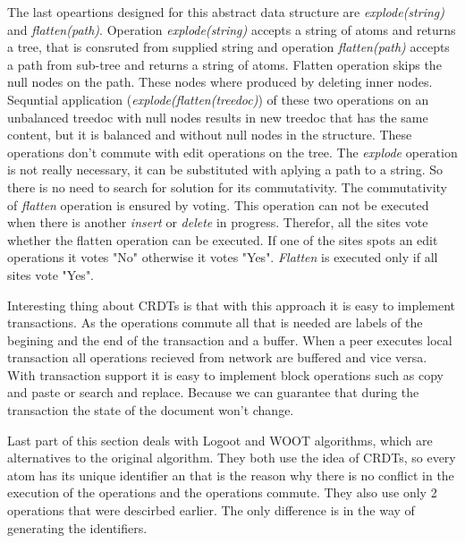 \documentclass[12pt,oneside]{fithesis2}
\begin{document}
\par The last opeartions designed for this abstract data structure are \textit{explode(string)} and \textit{flatten(path)}. Operation \textit{explode(string)} accepts a string of atoms and returns a tree, that is consruted from supplied string and operation \textit{flatten(path)} accepts a path from sub-tree and returns a string of atoms. Flatten operation skips the null nodes on the path. These nodes where produced by deleting inner nodes. Sequntial application (\textit{explode(flatten(treedoc)}) of these two operations on an unbalanced treedoc with null nodes results in new treedoc that has the same content, but it is balanced and without null nodes in the structure. These operations don't commute with edit operations on the tree. The \textit{explode} operation is not really necessary, it can be substituted with aplying a path to a string. So there is no need to search for solution for its commutativity. The commutativity of \textit{flatten} operation is ensured by voting. This operation can not be executed when there is another \textit{insert} or \textit{delete} in progress. Therefor, all the sites vote whether the flatten operation can be executed. If one of the sites spots an edit operations it votes "No" otherwise it votes "Yes". \textit{Flatten} is executed only if all sites vote "Yes".
\par Interesting thing about CRDTs is that with this approach it is easy to implement transactions. As the operations commute all that is needed are labels of the begining and the end of the transaction and a buffer. When a peer executes local transaction all operations recieved from network are buffered and vice versa. With transaction support it is easy to implement block operations such as copy and paste or search and replace. Because we can guarantee that during the transaction the state of the document won't change.
\par Last part of this section deals with Logoot and WOOT algorithms, which are alternatives to the original algorithm. They both use the idea of CRDTs, so every atom has its unique identifier an that is the reason why there is no conflict in the execution of the operations and the operations commute. They also use only 2 operations that were descirbed earlier. The only difference is in the way of generating the identifiers. 
\end{document}
